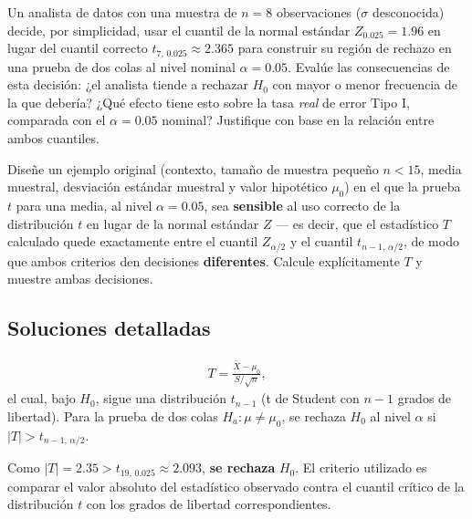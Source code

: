 \begin{problema}
	\label{prob:1faa4e6}
	Un analista de datos con una muestra de $n = 8$ observaciones ($\sigma$ desconocida) decide, por simplicidad, usar el cuantil de la normal estándar $Z_{0.025} = 1.96$ en lugar del cuantil correcto $t_{7,\,0.025} \approx 2.365$ para construir su región de rechazo en una prueba de dos colas al nivel nominal $\alpha = 0.05$. Evalúe las consecuencias de esta decisión: ¿el analista tiende a rechazar $H_0$ con mayor o menor frecuencia de la que debería? ¿Qué efecto tiene esto sobre la tasa \emph{real} de error Tipo I, comparada con el $\alpha = 0.05$ nominal? Justifique con base en la relación entre ambos cuantiles.
\end{problema}

\begin{problema}
	\label{prob:cb4980c}
	Diseñe un ejemplo original (contexto, tamaño de muestra pequeño $n < 15$, media muestral, desviación estándar muestral y valor hipotético $\mu_0$) en el que la prueba $t$ para una media, al nivel $\alpha = 0.05$, sea \textbf{sensible} al uso correcto de la distribución $t$ en lugar de la normal estándar $Z$ — es decir, que el estadístico $T$ calculado quede exactamente entre el cuantil $Z_{\alpha/2}$ y el cuantil $t_{n-1,\,\alpha/2}$, de modo que ambos criterios den decisiones \textbf{diferentes}. Calcule explícitamente $T$ y muestre ambas decisiones.
\end{problema}

\subsection*{Soluciones detalladas}

\begin{solproblema}[prob:b3d462b]
	\begin{align}
		T = \frac{\bar{X} - \mu_0}{S/\sqrt{n}},
	\end{align}
	el cual, bajo $H_0$, sigue una distribución $t_{n-1}$ (t de Student con $n-1$ grados de libertad). Para la prueba de dos colas $H_a: \mu \neq \mu_0$, se rechaza $H_0$ al nivel $\alpha$ si $|T| > t_{n-1,\,\alpha/2}$.
\end{solproblema}

\begin{solproblema}[prob:313cd70]
	Como $|T| = 2.35 > t_{19,\,0.025} \approx 2.093$, \textbf{se rechaza} $H_0$. El criterio utilizado es comparar el valor absoluto del estadístico observado contra el cuantil crítico de la distribución $t$ con los grados de libertad correspondientes.
\end{solproblema}

